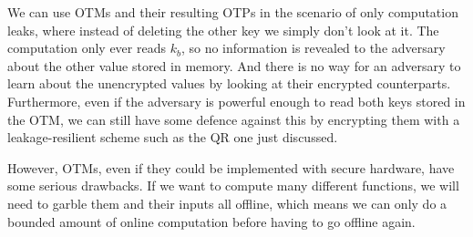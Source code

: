 \documentclass[10pt]{article}
\begin{document}
We can use OTMs and their resulting OTPs in the scenario of only computation leaks, where instead of deleting the other key we simply don't look at it. The computation only ever reads $k_b$, so no information is revealed to the adversary about the other value stored in memory. And there is no way for an adversary to learn about the unencrypted values by looking at their encrypted counterparts. Furthermore, even if the adversary is powerful enough to read both keys stored in the OTM, we can still have some defence against this by encrypting them with a leakage-resilient scheme such as the QR one just discussed.

However, OTMs, even if they could be implemented with secure hardware, have some serious drawbacks. If we want to compute many different functions, we will need to garble them and their inputs all offline, which means we can only do a bounded amount of online computation before having to go offline again.


\nocite{*}


\end{document}
